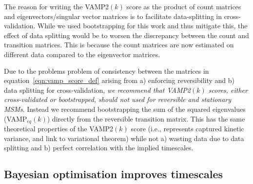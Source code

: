 \documentclass[journal=jacsat,manuscript=article]{achemso}
\begin{document}
The reason for writing the VAMP2$(k)$ score as the product of count matrices and eigenvectors/singular vector matrices is to facilitate data-splitting in cross-validation. While we used bootstrapping for this work and thus mitigate this, the effect of data splitting would be to worsen the discrepancy between the count and transition matrices. This is because the count matrices are now estimated on different data compared to the eigenvector matrices.  

Due to the problems problem of consistency between the matrices in equation~\ref{eqn:vamp_score_def} arising from a) enforcing reversibility and b) data splitting for cross-validation,  \emph{we recommend that VAMP2$(k)$ scores, either cross-validated or bootstrapped, should not used for reversible and stationary MSMs}. Instead we recommend bootstrapping the sum of the squared eigenvalues (VAMP$_{eq}(k)$) directly from the reversible transition matrix. This has the same theoretical properties of the VAMP2$(k)$ score (i.e., represents captured kinetic variance, and link to variational theorem) while not a) wasting data due to data splitting and b) perfect correlation with the implied timescales.





\subsection{Bayesian optimisation improves timescales}\label{sec:bayes}
\end{document}
